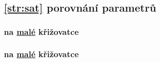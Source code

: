 \subsection{\ref{str:sat} porovnání parametrů}\label{subsec:sat_porovnani_parametru}

\subsubsection{ na \hyperref[par:data_mala]{malé} křižovatce}
\label{subsubsec:exp_satsg_mala_krizovatka}


\subsubsection{ na \hyperref[par:data_mala]{malé} křižovatce}
\label{subsubsec:exp_sata_mala_krizovatka}

